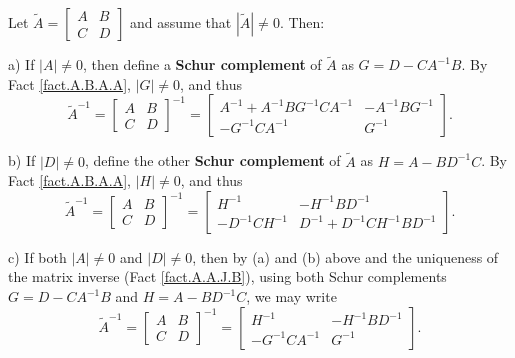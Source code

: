 \begin{fact} \label{fact.A.B.A.B}
Let $\tilde A=\begin{bmatrix} A & B \\ C & D \end{bmatrix}$
and assume that $|\tilde A|\ne 0$.  Then:

\noindent a) If $|A|\ne 0$, then define a {\bf Schur complement} of
$\tilde A$ as $G=D-CA^{-1}B$.  By Fact \ref{fact.A.B.A.A}, $|G|\ne 0$, and thus
\begin{equation*}
    \tilde A^{-1} = \begin{bmatrix} A & B \\ C & D \end{bmatrix}^{-1} =
    \begin{bmatrix} A^{-1}+A^{-1} B G^{-1} C A^{-1} & -A^{-1} B G^{-1} \\ -G^{-1} C A^{-1} & G^{-1} \end{bmatrix}.
\end{equation*}

\noindent b) If $|D|\ne 0$, define the other {\bf Schur
complement} of $\tilde A$ as $H=A-BD^{-1}C$.  By Fact \ref{fact.A.B.A.A}, $|H|\ne 0$, and thus
\begin{equation*}
    \tilde A^{-1} = \begin{bmatrix} A & B \\ C & D \end{bmatrix}^{-1} =
    \begin{bmatrix} H^{-1} & -H^{-1} B D^{-1} \\ - D^{-1} C H^{-1} & D^{-1}+ D^{-1} C H^{-1} B D^{-1}  \end{bmatrix}.
\end{equation*}

\noindent c) If both $|A|\ne 0$ and $|D|\ne 0$, then by (a) and (b) above and the uniqueness of the matrix inverse (Fact \ref{fact.A.A.J.B}),
using both Schur complements $G=D-CA^{-1}B$ and $H=A-BD^{-1}C$, we may write
\begin{equation*}
    \tilde A^{-1} = \begin{bmatrix} A & B \\ C & D \end{bmatrix}^{-1} =
    \begin{bmatrix} H^{-1} & -H^{-1}BD^{-1} \\  -G^{-1}CA^{-1} & G^{-1} \end{bmatrix}.
\end{equation*}
\end{fact}

